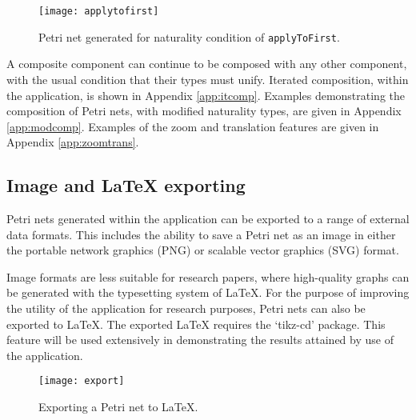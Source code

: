 \documentclass[../Dissertation.tex]{subfiles}
\begin{document}
\begin{figure}[H]
\begin{center}
\texttt{[image: applytofirst]}
\end{center}
\caption{Petri net generated for naturality condition of \lstinline{applyToFirst}.}
\label{fig:applytofirstimg}
\end{figure}

A composite component can continue to be composed with any other component, with the usual condition that their types must unify. Iterated composition, within the application, is shown in Appendix \ref{app:itcomp}. Examples demonstrating the composition of Petri nets, with modified naturality types, are given in Appendix \ref{app:modcomp}. Examples of the zoom and translation features are given in Appendix \ref{app:zoomtrans}.

\subsection{Image and LaTeX exporting}
Petri nets generated within the application can be exported to a range of external data formats. This includes the ability to save a Petri net as an image in either the portable network graphics (PNG) or scalable vector graphics (SVG) format.
\par
Image formats are less suitable for research papers, where high-quality graphs can be generated with the typesetting system of LaTeX. For the purpose of improving the utility of the application for research purposes, Petri nets can also be exported to LaTeX. The exported LaTeX requires the `tikz-cd' package. This feature will be used extensively in demonstrating the results attained by use of the application.
\begin{figure}[H]
\begin{center}
\texttt{[image: export]}
\end{center}
\caption{Exporting a Petri net to LaTeX.}
\label{fig:export}
\end{figure}
\end{document}

